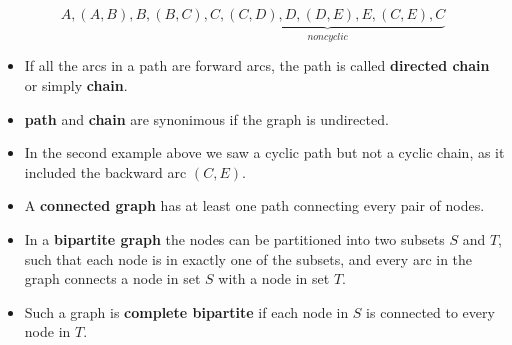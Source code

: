 \documentclass[c]{beamer}
\begin{document}
\begin{frame}
  \begin{center}
\end{center}
\[A,(A,B),B,(B,C),\underbrace{C,(C,D),D,(D,E),E,(C,E),C}_{noncyclic}\]

\end{frame}

\begin{frame}
  \begin{itemize}
    \item If all the arcs in a path are forward arcs, the path is called {\bf directed chain} or simply {\bf chain}.
    \item {\bf path} and {\bf chain} are synonimous if the graph is undirected.
    \item In the second example above we saw a cyclic path but not a cyclic chain, as it included the backward arc $(C,E)$. 
    \item A {\bf connected graph} has at least one path connecting every pair of nodes.
    \item In a {\bf bipartite graph} the nodes can be partitioned into two subsets $S$ and $T$, such that each node is in exactly one of the subsets, and every arc in the graph connects a node in set $S$ with a node in set $T$.
    \item Such a graph is {\bf complete bipartite} if each node in $S$ is connected to every node in $T$.
  \end{itemize}
\end{frame}
\end{document}

